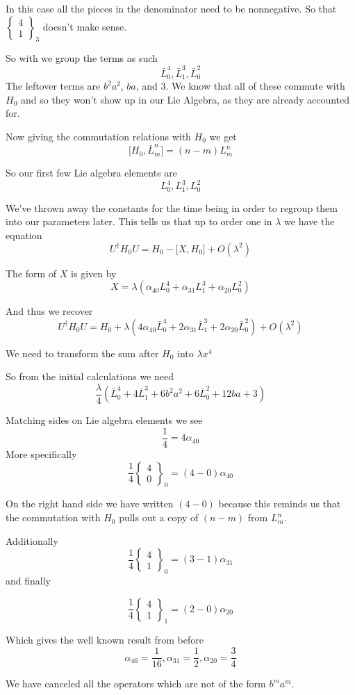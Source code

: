 \documentclass{article}
\newcommand{\lrbrack}[2]{\lbrack #1 , #2 \rbrack}
\newcommand{\wbc}[3]{\left\{\begin{array}{cc}
		{#1}\\{#2}
	\end{array} \right\}_{#3}}
\begin{document}
In this case all the pieces in the denominator need to be nonnegative.  So that $\wbc{4}{1}{3}$ doesn't make sense.


So with we group the terms as such
\[
\bar{L}_0^4, \bar{L}_1^3, \bar{L}_0^2
\]
The leftover terms are
$b^2 a^2$, $ba$, and $3$.  We know that all of these commute with $H_0$ and so they won't show up in our Lie Algebra, as they are already accounted for.

Now giving the commutation relations with $H_0$ we get
\[
\lrbrack{H_0}{\bar{L}_m^n} = (n-m)L_m^n
\]

So our first few Lie algebra elements are
\[
L_0^4, L_1^3, L_0^2
\]

We've thrown away the constants for the time being in order to regroup them into our parameters later.  This tells us that up to order one in $\lambda$ we have the equation
\[
U^{\dagger}H_0 U = H_0 - \lrbrack{X}{H_0} + O(\lambda^2)
\]

The form of $X$ is given by
\begin{equation}
X = \lambda (\alpha_{40}L_0^4 + \alpha_{31}L_1^3 + \alpha_{20}L_0^2)
\end{equation}

And thus we recover
\[
U^{\dagger} H_0 U  = H_0 + \lambda(4\alpha_{40}\bar{L}_0^4 + 2\alpha_{31}\bar{L}_1^3 + 2\alpha_{20}\bar{L}_0^2) + O(\lambda^2)
\]

We need to transform the sum after $H_0$ into $\lambda x^4$

So from the initial calculations we need
\[
\frac{\lambda}{4}(\bar{L}_0^4 + 4 \bar{L}_1^3 + 6b^2 a^2 + 6 \bar{L}_0^2 + 12 ba + 3)
\]



Matching sides on Lie algebra elements we see
\[
\frac{1}{4} = 4 \alpha_{40}
\]
More specifically
\[
\frac{1}{4}\wbc{4}{0}{0} = (4-0)\alpha_{40}
\]

On the right hand side we have written $(4-0)$ because this reminds us that the commutation with $H_0$ pulls out a copy of $(n-m)$ from $L_m^n$.

Additionally
\[
\frac{1}{4}\wbc{4}{1}{0} = (3-1)\alpha_{31}
\]
and finally

\[
\frac{1}{4}\wbc{4}{1}{1} = (2-0) \alpha_{20}
\]


Which gives the well known result from before
\[
\alpha_{40} = \frac{1}{16}, \alpha_{31} = \frac{1}{2}, \alpha_{20} = \frac{3}{4}
\]


We have canceled all the operators which are not of the form $b^m a^m$.
\end{document}
